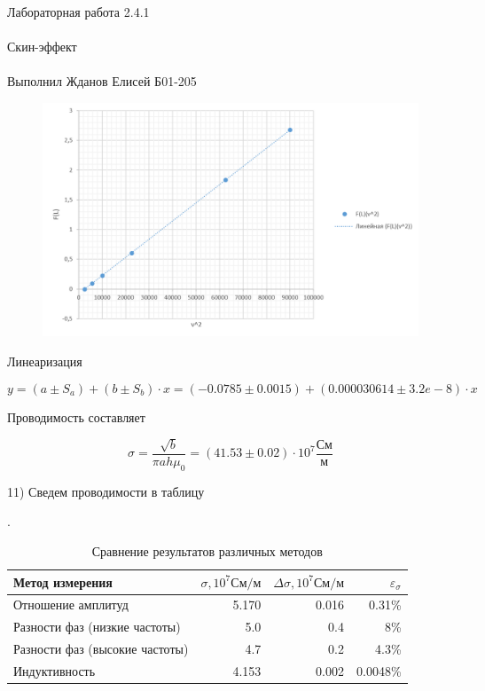 \documentclass{astroedu-lab}
\begin{document}
\begin{problem}{\huge Лабораторная работа 2.4.1\\\\Скин-эффект\\\\Выполнил Жданов Елисей Б01-205}
\begin{figure}[!h]
	\centering
	\includegraphics[width=1\textwidth]{гр6.png}
	\label{fig:boiler}
\end{figure}

Линеаризация

\begin{equation}
	y = (a \pm S_a) + (b \pm S_b) \cdot x = (-0.0785 \pm 0.0015) + (0.000030614 \pm 3.2e-8) \cdot x
\end{equation}

Проводимость составляет

\begin{equation}
	\sigma = \frac{\sqrt{b}}{\pi a h \mu_0} = (41.53 \pm 0.02) \cdot 10^7 \frac{\text{См}}{\text{м}}
\end{equation}

11) Сведем проводимости в таблицу

.

\begin{table}[!h]
\begin{center}
\begin{tabular}{lrrr}
Метод измерения & $\sigma, 10^{7} \text{См/м}$ & $\Delta\sigma, 10^{7} \text{См/м}$ & $\varepsilon_{\sigma}$\\
\toprule
Отношение амплитуд & 5.170 & 0.016 & 0.31\%\\
Разности фаз (низкие частоты) & 5.0 & 0.4 & 8\%\\
Разности фаз (высокие частоты) & 4.7 & 0.2 & 4.3\%\\
Индуктивность & 4.153 & 0.002 & 0.0048\%\\

\end{tabular}
\end{center}
    \caption{Сравнение результатов различных методов}\label{}
\end{table}


\end{problem}
\end{document}
